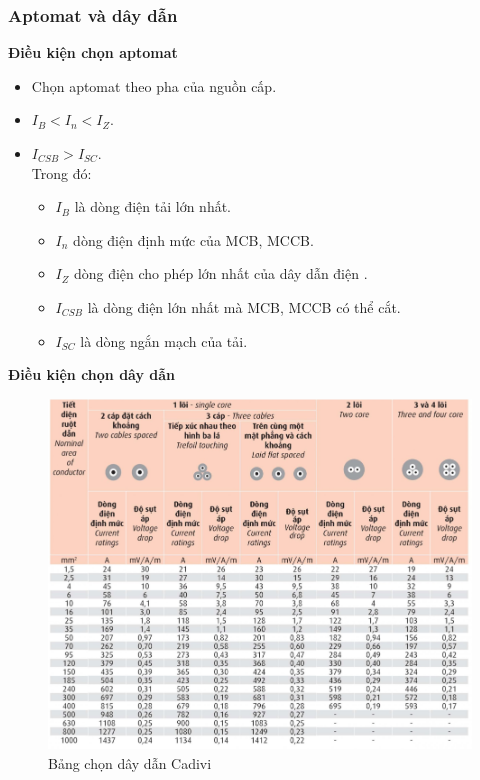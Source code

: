         \subsubsection{Aptomat và dây dẫn}
            \textbf{Điều kiện chọn aptomat}
                \begin{itemize}
                    \item Chọn aptomat theo pha của nguồn cấp.
                    \item $I_{B} < I_{n} < I_{Z}$.
                    \item $I_{CSB} > I_{SC}$.\\[0.2cm]
                    Trong đó:
                    \begin{itemize}
                        \item $I_{B}$ là dòng điện tải lớn nhất.
                        \item $I_{n}$ dòng điện định mức của MCB, MCCB.
                        \item $I_{Z}$ dòng điện cho phép lớn nhất của dây dẫn điện .
                        \item $I_{CSB}$ là dòng điện lớn nhất mà MCB, MCCB có thể cắt.
                        \item $I_{SC}$ là dòng ngắn mạch của tải.
                    \end{itemize}
                \end{itemize}
            \textbf{Điều kiện chọn dây dẫn}
                \begin{figure}[H]
                    \centering
                    \includegraphics[width=1\textwidth]{pictures/2h.png}
                    \caption{Bảng chọn dây dẫn Cadivi}
                \end{figure}
